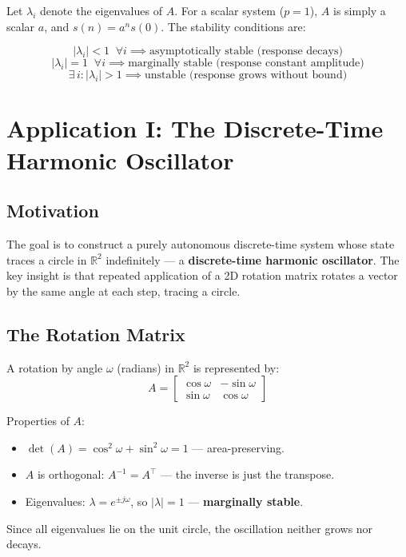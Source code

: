 \documentclass[11pt]{article}
\begin{document}
Let $\lambda_i$ denote the eigenvalues of $A$. For a scalar system ($p = 1$), $A$ is simply a scalar $a$, and $s(n) = a^n s(0)$. The stability conditions are:

\[
  |\lambda_i| < 1 \;\;\forall i \implies \text{asymptotically stable (response decays)}
\]
\[
  |\lambda_i| = 1 \;\;\forall i \implies \text{marginally stable (response constant amplitude)}
\]
\[
  \exists\, i : |\lambda_i| > 1 \implies \text{unstable (response grows without bound)}
\]

 
\section{Application I: The Discrete-Time Harmonic Oscillator}

\subsection{Motivation}

The goal is to construct a purely autonomous discrete-time system whose state traces a circle in $\mathbb{R}^2$ indefinitely — a \textbf{discrete-time harmonic oscillator}. The key insight is that repeated application of a 2D rotation matrix rotates a vector by the same angle at each step, tracing a circle.

\subsection{The Rotation Matrix}

A rotation by angle $\omega$ (radians) in $\mathbb{R}^2$ is represented by:
\[
  A = \begin{bmatrix} \cos\omega & -\sin\omega \\ \sin\omega & \cos\omega \end{bmatrix}
\]

Properties of $A$:
\begin{itemize}
  \item $\det(A) = \cos^2\omega + \sin^2\omega = 1$ — area-preserving.
  \item $A$ is orthogonal: $A^{-1} = A^\top$ — the inverse is just the transpose.
  \item Eigenvalues: $\lambda = e^{\pm j\omega}$, so $|\lambda| = 1$ — \textbf{marginally stable}.
\end{itemize}

Since all eigenvalues lie on the unit circle, the oscillation neither grows nor decays.
\end{document}
